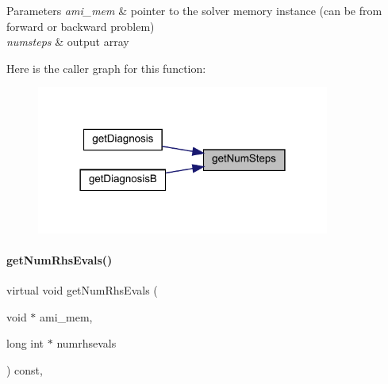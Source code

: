 \begin{DoxyParams}{Parameters}
{\em ami\+\_\+mem} & pointer to the solver memory instance (can be from forward or backward problem) \\
\hline
{\em numsteps} & output array \\
\hline
\end{DoxyParams}
Here is the caller graph for this function\+:
\nopagebreak
\begin{figure}[H]
\begin{center}
\leavevmode
\includegraphics[width=273pt]{classamici_1_1_solver_ac72a1a31217465d0f016b38382e487fa_icgraph}
\end{center}
\end{figure}
\mbox{\label{classamici_1_1_solver_aaf8d4b1375cfa9e517ef0ec54e33d4d8}} 
\paragraph{\texorpdfstring{getNumRhsEvals()}{getNumRhsEvals()}}
{\footnotesize\ttfamily virtual void get\+Num\+Rhs\+Evals (\begin{DoxyParamCaption}\item[{void $\ast$}]{ami\+\_\+mem,  }\item[{long int $\ast$}]{numrhsevals }\end{DoxyParamCaption}) const\hspace{0.3cm}{\ttfamily [protected]}, {}}


